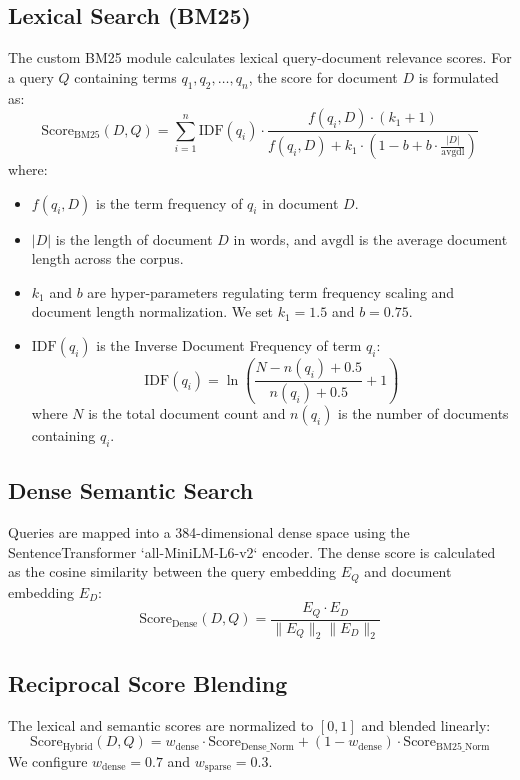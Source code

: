 \documentclass[11pt,journal,onecolumn]{IEEEtran}
\begin{document}
\subsection{Lexical Search (BM25)}
The custom BM25 module calculates lexical query-document relevance scores. For a query $Q$ containing terms $q_1, q_2, \dots, q_n$, the score for document $D$ is formulated as:
\begin{equation}
\text{Score}_{\text{BM25}}(D, Q) = \sum_{i=1}^n \text{IDF}(q_i) \cdot \frac{f(q_i, D) \cdot (k_1 + 1)}{f(q_i, D) + k_1 \cdot \left(1 - b + b \cdot \frac{|D|}{\text{avgdl}}\right)}
\end{equation}
where:
\begin{itemize}
    \item $f(q_i, D)$ is the term frequency of $q_i$ in document $D$.
    \item $|D|$ is the length of document $D$ in words, and $\text{avgdl}$ is the average document length across the corpus.
    \item $k_1$ and $b$ are hyper-parameters regulating term frequency scaling and document length normalization. We set $k_1 = 1.5$ and $b = 0.75$.
    \item $\text{IDF}(q_i)$ is the Inverse Document Frequency of term $q_i$:
    \begin{equation}
    \text{IDF}(q_i) = \ln\left( \frac{N - n(q_i) + 0.5}{n(q_i) + 0.5} + 1 \right)
    \end{equation}
    where $N$ is the total document count and $n(q_i)$ is the number of documents containing $q_i$.
\end{itemize}

\subsection{Dense Semantic Search}
Queries are mapped into a 384-dimensional dense space using the SentenceTransformer `all-MiniLM-L6-v2` encoder. The dense score is calculated as the cosine similarity between the query embedding $E_Q$ and document embedding $E_D$:
\begin{equation}
\text{Score}_{\text{Dense}}(D, Q) = \frac{E_Q \cdot E_D}{\|E_Q\|_2 \|E_D\|_2}
\end{equation}

\subsection{Reciprocal Score Blending}
The lexical and semantic scores are normalized to $[0, 1]$ and blended linearly:
\begin{equation}
\text{Score}_{\text{Hybrid}}(D, Q) = w_{\text{dense}} \cdot \text{Score}_{\text{Dense\_Norm}} + (1 - w_{\text{dense}}) \cdot \text{Score}_{\text{BM25\_Norm}}
\end{equation}
We configure $w_{\text{dense}} = 0.7$ and $w_{\text{sparse}} = 0.3$.
\end{document}
